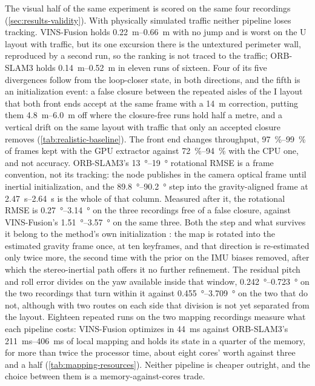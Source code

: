 The visual half of the same experiment is scored on the same four recordings
(\cref{sec:results-validity}). With physically simulated traffic
neither pipeline loses tracking. VINS-Fusion holds \SIrange{0.22}{0.66}{\metre}
with no jump and is worst on the U layout with traffic, but its one
excursion there is the untextured perimeter wall, reproduced by a second run,
so the ranking is not traced to the traffic; ORB-SLAM3 holds
\SIrange{0.14}{0.52}{\metre} in eleven runs of sixteen. Four of its five
divergences follow from the loop-closer state, in both directions, and the
fifth is an initialization event: a false closure between the repeated aisles of the I layout
that both front ends accept at the same frame with a \SI{14}{\metre}
correction, putting them \SIrange{4.8}{6.0}{\metre} off where the closure-free
runs hold half a metre, and a vertical drift on the same layout with traffic
that only an accepted closure removes (\cref{tab:realistic-baseline}). The
front end changes throughput, \SIrange{97}{99}{\percent} of frames kept with
the GPU extractor against \SIrange{72}{94}{\percent} with the CPU one, and not
accuracy. ORB-SLAM3's \SIrange{13}{19}{\degree} rotational RMSE is a
frame convention, not its tracking: the node publishes in the camera optical
frame until inertial initialization, and the \SIrange{89.8}{90.2}{\degree} step
into the gravity-aligned frame at \SIrange{2.47}{2.64}{\second} is the whole of
that column. Measured after it, the rotational RMSE is
\SIrange{0.27}{3.14}{\degree} on the three recordings free of a false closure,
against VINS-Fusion's \SIrange{1.51}{3.57}{\degree} on the same three. Both the step and
what survives it belong to the method's own initialization \cite{campos2021}:
the map is rotated into the estimated gravity frame once, at ten keyframes,
and that direction is re-estimated only twice more, the second time with the
prior on the IMU biases removed, after which the stereo-inertial path offers
it no further refinement. The residual pitch and roll error divides on the
yaw available inside that window, \SIrange{0.242}{0.723}{\degree} on the two
recordings that turn within it against \SIrange{0.455}{3.709}{\degree} on the
two that do not, although with two routes on each side that division is not
yet separated from the layout. Eighteen repeated runs on the two mapping recordings
measure what each pipeline costs: VINS-Fusion optimizes in
\SI{44}{\milli\second} against ORB-SLAM3's \SIrange{211}{406}{\milli\second}
of local mapping and holds its state in a quarter of the memory, for more
than twice the processor time, about eight cores' worth against three and a
half (\cref{tab:mapping-resources}). Neither pipeline is cheaper outright,
and the choice between them is a memory-against-cores trade.

